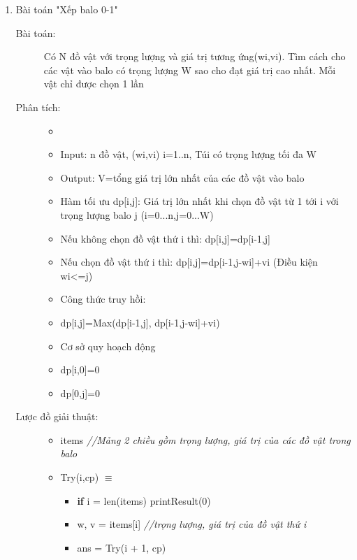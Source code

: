 \begin{enumerate}
    \item Bài toán "Xếp balo 0-1"
    \begin{description}
        \item[Bài toán:]Có N đồ vật với trọng lượng và giá trị tương ứng(wi,vi). Tìm cách cho các vật vào balo có trọng lượng W sao cho đạt giá trị cao
        nhất. Mỗi vật chỉ được chọn 1 lần
        \item[Phân tích:]
            \begin{itemize}
                \item[]
                \item Input: n đồ vật, (wi,vi) i=1..n, Túi có trọng lượng tối đa W
                \item Output: V=tổng giá trị lớn nhất của các đồ vật vào balo
                \item Hàm tối ưu dp[i,j]: Giá trị lớn nhất khi chọn đồ vật từ 1 tới i với trọng lượng balo j (i=0...n,j=0...W)
                \item[]Nếu không chọn đồ vật thứ i thì: dp[i,j]=dp[i-1,j]
                \item[]Nếu chọn đồ vật thứ i thì: dp[i,j]=dp[i-1,j-wi]+vi (Điều kiện wi<=j)
                \item Công thức truy hồi: 
                \item[]dp[i,j]=Max(dp[i-1,j], dp[i-1,j-wi]+vi)
                \item Cơ sở quy hoạch động
                \item[]dp[i,0]=0
                \item[]dp[0,j]=0
            \end{itemize}
            \item[Lược đồ giải thuật:]
            \item[] 
            \colorbox{mygrey}{\parbox{14.5cm}{
                \begin{itemize}
                    \item [] items \textit{//Mảng 2 chiều gồm trọng lượng, giá trị của các đồ vật trong balo}
                    \item [] Try(i,cp) $\equiv$
                        \begin{itemize}
                            \item [] \textbf{if} i = len(items) printResult(0)
                            \item []w, v = items[i] \textit{//trọng lượng, giá trị của đồ vật thứ i}
                            \item []ans = Try(i + 1, cp)

\end{itemize}
\end{itemize}}}
\end{description}
\end{enumerate}
